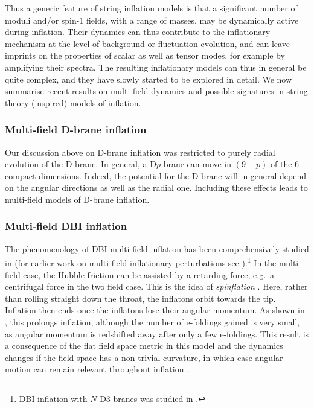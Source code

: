Thus a generic feature of string inflation models is that a significant number of  moduli and/or spin-1 fields, with a range of masses, may be  dynamically active during inflation. Their dynamics can thus contribute to the inflationary mechanism at the level of background or fluctuation evolution, and can leave imprints on the properties of scalar as well as tensor modes, for example by amplifying their spectra.  The resulting inflationary models can thus in general be quite complex, and they have  slowly started  to be explored in detail. We now summarise  recent results on multi-field dynamics and possible signatures in string theory (inspired) models of inflation.


\subsubsection{Multi-field D-brane inflation}

Our discussion above on D-brane inflation was restricted  to purely radial evolution of the D-brane. In general, a D$p$-brane can move in $(9-p)$ of the 6  compact dimensions. Indeed, the potential for the D-brane will in general depend on the angular directions as well as the radial one. Including these effects leads to multi-field models of D-brane inflation. 

\subsubsection*{Multi-field DBI inflation}

The phenomenology of DBI multi-field inflation has been comprehensively studied in \cite{Easson:2007dh,Huang:2007hh,Langlois:2008mn,Langlois:2008wt,Langlois:2008qf,Renaux-Petel:2009jdf,Gregory:2011cd,Emery:2013yua,Kidani:2014pka}
(for earlier work on multi-field inflationary perturbations see  \cite{Sasaki:1995aw,Gordon:2000hv,GrootNibbelink:2001qt}).\footnote{DBI inflation with $N$ D3-branes was studied in \cite{Ward:2007gs}.}
In the multi-field case, the Hubble friction can be assisted by a retarding force, e.g.~a centrifugal force in the two field case. This is the idea of {\em spinflation} \cite{Easson:2007dh}. Here, rather than rolling straight down the throat, the inflatons orbit towards the tip. Inflation then ends once
 the inflatons lose their angular momentum.  As shown in \cite{Easson:2007dh}, this prolongs inflation, although the number of e-foldings gained is very small, as angular momentum is redshifted away after only a few e-foldings.  This result is a consequence of the flat field space metric in this model and the dynamics changes if the field space has a non-trivial curvature, in which case angular motion can remain relevant throughout inflation \cite{Brown:2017osf}.  


